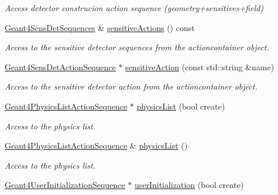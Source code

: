 \begin{DoxyCompactItemize}
\begin{DoxyCompactList}\small\item\em Access detector construcion action sequence (geometry+sensitives+field) \end{DoxyCompactList}\item 
\hyperlink{class_d_d4hep_1_1_simulation_1_1_geant4_sens_det_sequences}{Geant4\+Sens\+Det\+Sequences} \& \hyperlink{class_d_d4hep_1_1_simulation_1_1_geant4_action_container_a2a0275a74e40d74fe67334fd100dd3a1}{sensitive\+Actions} () const
\begin{DoxyCompactList}\small\item\em Access to the sensitive detector sequences from the actioncontainer object. \end{DoxyCompactList}\item 
\hyperlink{class_d_d4hep_1_1_simulation_1_1_geant4_sens_det_action_sequence}{Geant4\+Sens\+Det\+Action\+Sequence} $\ast$ \hyperlink{class_d_d4hep_1_1_simulation_1_1_geant4_action_container_a9e52e2e6655f19963fc07b86cc483928}{sensitive\+Action} (const std\+::string \&name)
\begin{DoxyCompactList}\small\item\em Access to the sensitive detector action from the actioncontainer object. \end{DoxyCompactList}\item 
\hyperlink{class_d_d4hep_1_1_simulation_1_1_geant4_physics_list_action_sequence}{Geant4\+Physics\+List\+Action\+Sequence} $\ast$ \hyperlink{class_d_d4hep_1_1_simulation_1_1_geant4_action_container_a78cbddc837b75f151cf76b483b588fb1}{physics\+List} (bool create)
\begin{DoxyCompactList}\small\item\em Access to the physics list. \end{DoxyCompactList}\item 
\hyperlink{class_d_d4hep_1_1_simulation_1_1_geant4_physics_list_action_sequence}{Geant4\+Physics\+List\+Action\+Sequence} \& \hyperlink{class_d_d4hep_1_1_simulation_1_1_geant4_action_container_aaeb1188d7bf8338290d1d7080c5c2e18}{physics\+List} ()
\begin{DoxyCompactList}\small\item\em Access to the physics list. \end{DoxyCompactList}\item 
\hyperlink{class_d_d4hep_1_1_simulation_1_1_geant4_user_initialization_sequence}{Geant4\+User\+Initialization\+Sequence} $\ast$ \hyperlink{class_d_d4hep_1_1_simulation_1_1_geant4_action_container_a04ba4fd85ae343b856d73dcb3cc0e9b3}{user\+Initialization} (bool create)

\end{DoxyCompactItemize}
